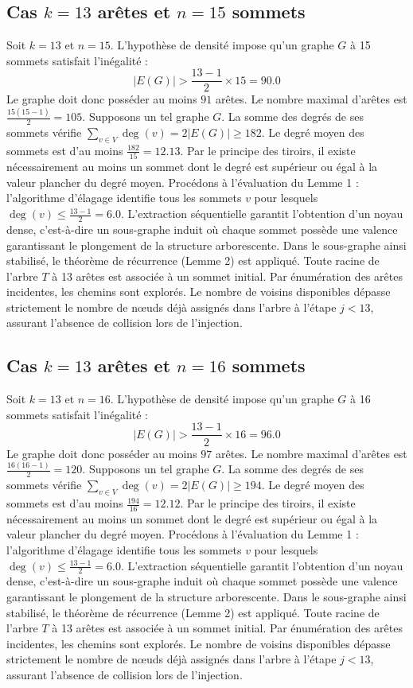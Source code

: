 \documentclass[12pt,a4paper]{article}
\begin{document}
\subsection{Cas $k = 13$ arêtes et $n = 15$ sommets}
Soit $k = 13$ et $n = 15$. L'hypothèse de densité impose qu'un graphe $G$ à 15 sommets satisfait l'inégalité :
$$ |E(G)| > \frac{13-1}{2} \times 15 = 90.0 $$
Le graphe doit donc posséder au moins $91$ arêtes. Le nombre maximal d'arêtes est $\frac{15(15-1)}{2} = 105$.
Supposons un tel graphe $G$. La somme des degrés de ses sommets vérifie $\sum_{v \in V} \deg(v) = 2|E(G)| \geq 182$.
Le degré moyen des sommets est d'au moins $\frac{182}{15} = 12.13$.
Par le principe des tiroirs, il existe nécessairement au moins un sommet dont le degré est supérieur ou égal à la valeur plancher du degré moyen.
Procédons à l'évaluation du Lemme 1 : l'algorithme d'élagage identifie tous les sommets $v$ pour lesquels $\deg(v) \leq \frac{13-1}{2} = 6.0$.
L'extraction séquentielle garantit l'obtention d'un noyau dense, c'est-à-dire un sous-graphe induit où chaque sommet possède une valence garantissant le plongement de la structure arborescente.
Dans le sous-graphe ainsi stabilisé, le théorème de récurrence (Lemme 2) est appliqué. Toute racine de l'arbre $T$ à 13 arêtes est associée à un sommet initial. Par énumération des arêtes incidentes, les chemins sont explorés. Le nombre de voisins disponibles dépasse strictement le nombre de nœuds déjà assignés dans l'arbre à l'étape $j < 13$, assurant l'absence de collision lors de l'injection.

\subsection{Cas $k = 13$ arêtes et $n = 16$ sommets}
Soit $k = 13$ et $n = 16$. L'hypothèse de densité impose qu'un graphe $G$ à 16 sommets satisfait l'inégalité :
$$ |E(G)| > \frac{13-1}{2} \times 16 = 96.0 $$
Le graphe doit donc posséder au moins $97$ arêtes. Le nombre maximal d'arêtes est $\frac{16(16-1)}{2} = 120$.
Supposons un tel graphe $G$. La somme des degrés de ses sommets vérifie $\sum_{v \in V} \deg(v) = 2|E(G)| \geq 194$.
Le degré moyen des sommets est d'au moins $\frac{194}{16} = 12.12$.
Par le principe des tiroirs, il existe nécessairement au moins un sommet dont le degré est supérieur ou égal à la valeur plancher du degré moyen.
Procédons à l'évaluation du Lemme 1 : l'algorithme d'élagage identifie tous les sommets $v$ pour lesquels $\deg(v) \leq \frac{13-1}{2} = 6.0$.
L'extraction séquentielle garantit l'obtention d'un noyau dense, c'est-à-dire un sous-graphe induit où chaque sommet possède une valence garantissant le plongement de la structure arborescente.
Dans le sous-graphe ainsi stabilisé, le théorème de récurrence (Lemme 2) est appliqué. Toute racine de l'arbre $T$ à 13 arêtes est associée à un sommet initial. Par énumération des arêtes incidentes, les chemins sont explorés. Le nombre de voisins disponibles dépasse strictement le nombre de nœuds déjà assignés dans l'arbre à l'étape $j < 13$, assurant l'absence de collision lors de l'injection.
\end{document}

